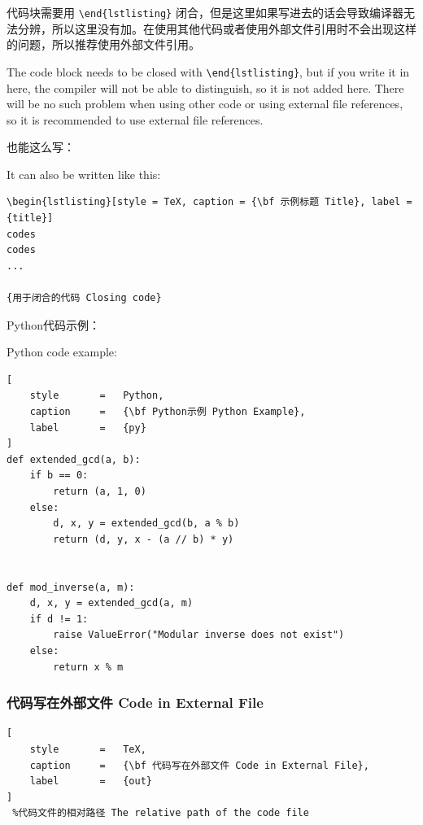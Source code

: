 \documentclass{article}
\begin{document}
代码块需要用 \verb|\end{lstlisting}| 闭合，但是这里如果写进去的话会导致编译器无法分辨，所以这里没有加。在使用其他代码或者使用外部文件引用时不会出现这样的问题，所以推荐使用外部文件引用。

The code block needs to be closed with \verb|\end{lstlisting}|, but if you write it in here, the compiler will not be able to distinguish, so it is not added here. There will be no such problem when using other code or using external file references, so it is recommended to use external file references.


\vspace{0.5cm}

也能这么写：

It can also be written like this:

\begin{lstlisting}[style = TeX, caption = {\bf 代码写在内部文件 Code in Internal File}, label = {code}]
\begin{lstlisting}[style = TeX, caption = {\bf 示例标题 Title}, label = {title}]
codes
codes
...

{用于闭合的代码 Closing code}
\end{lstlisting}


\vspace{0.5cm}

Python代码示例：

Python code example:

\begin{lstlisting}[
    style       =   Python,
    caption     =   {\bf Python示例 Python Example},
    label       =   {py}
]
def extended_gcd(a, b):
    if b == 0:
        return (a, 1, 0)
    else:
        d, x, y = extended_gcd(b, a % b)
        return (d, y, x - (a // b) * y)


def mod_inverse(a, m):
    d, x, y = extended_gcd(a, m)
    if d != 1:
        raise ValueError("Modular inverse does not exist")
    else:
        return x % m
\end{lstlisting}



\subsubsection{代码写在外部文件 Code in External File}

\begin{lstlisting}[
    style       =   TeX,
    caption     =   {\bf 代码写在外部文件 Code in External File},
    label       =   {out}
]
 %代码文件的相对路径 The relative path of the code file
\end{lstlisting} 
\end{document}

